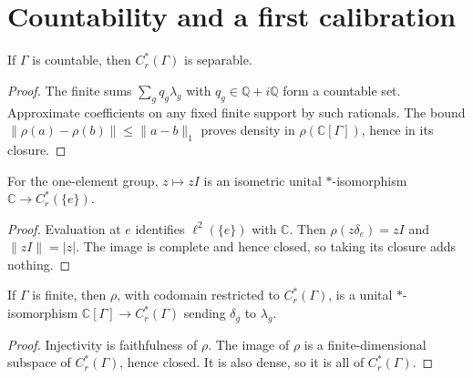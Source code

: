 \section{Countability and a first calibration}

\begin{proposition}[Separability]\label{prop:reduced-group-cstar-separable}
\leanok
{}
If $\Gamma$ is countable, then $C_r^*(\Gamma)$ is separable.
\end{proposition}
\begin{proof}
\leanok
The finite sums $\sum_g q_g\lambda_g$ with $q_g\in\mathbb Q+i\mathbb Q$
form a countable set. Approximate coefficients on any fixed finite support
by such rationals. The bound
$\|\rho(a)-\rho(b)\|\leq\|a-b\|_1$ proves density in
$\rho(\mathbb C[\Gamma])$, hence in its closure.
\end{proof}

\begin{proposition}\label{prop:reduced-group-cstar-trivial}
\leanok
{}
For the one-element group, $z\mapsto zI$ is an isometric unital
$*$-isomorphism $\mathbb C\to C_r^*(\{e\})$.
\end{proposition}
\begin{proof}
\leanok
Evaluation at $e$ identifies $\ell^2(\{e\})$ with $\mathbb C$.
Then $\rho(z\delta_e)=zI$ and $\|zI\|=|z|$.
The image is complete and hence closed, so taking its closure adds nothing.
\end{proof}

\begin{proposition}\label{prop:reduced-group-cstar-finite}
\leanok
{}
If $\Gamma$ is finite, then $\rho$, with codomain restricted to
$C_r^*(\Gamma)$, is a unital $*$-isomorphism
$\mathbb C[\Gamma]\to C_r^*(\Gamma)$ sending $\delta_g$ to $\lambda_g$.
\end{proposition}
\begin{proof}
\leanok
Injectivity is faithfulness of $\rho$. The image of $\rho$ is a
finite-dimensional subspace of $C_r^*(\Gamma)$, hence closed. It is also
dense, so it is all of $C_r^*(\Gamma)$.
\end{proof}

